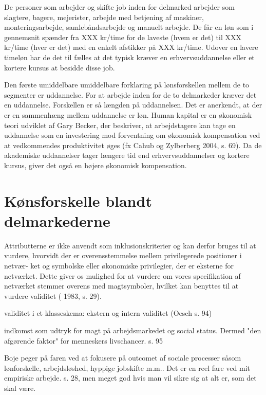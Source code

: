 %
De personer som arbejder og skifte job inden for delmarked  arbejder som slagtere, bagere, mejerister, arbejde med betjening af maskiner, monteringsarbejde, samlebåndsarbejde og manuelt arbejde. De får en løn som i gennemsnit spænder fra XXX kr/time for de laveste (hvem er det) til XXX kr/time (hver er det) med en enkelt afstikker på XXX kr/time. Udover en lavere timeløn har de det til fælles at det typisk kræver en erhvervsuddannelse eller et kortere kursus at besidde disse job.

Den første umiddelbare umiddelbare forklaring på lønsforskellen mellem de to segmenter er uddannelse. For at arbejde inden for de to delmarkeder kræver det en uddannelse. Forskellen er så længden på uddannelsen. Det er anerkendt, at der er en sammenhæng mellem uddannelse er løn. Human kapital er en økonomisk teori udviklet af Gary Becker, der beskriver, at arbejdstagere kan tage en uddannelse som en investering mod forventning om økonomisk kompensation ved at vedkommendes produktivitet øges (fx Cahub og Zylberberg 2004, s. 69). Da de akademiske uddannelser tager længere tid end erhvervsuddannelser og kortere kursus, giver det også en højere økonomisk kompensation. 


\newpage \section{Kønsforskelle blandt delmarkederne \label{sec_delanalyse2_loen}}


\iffalse
\label{iffalse}

Attributterne er ikke anvendt som inklusionskriterier og kan derfor bruges til at
vurdere, hvorvidt der er overensstemmelse mellem privilegerede positioner i netvær-
ket og symbolske eller økonomiske privilegier, der er eksterne for netværket. Dette giver
os mulighed for at vurdere om vores specifikation af netværket stemmer overens med
magtsymboler, hvilket kan benyttes til at vurdere validitet ( 1983, s. 29).


validitet i et klasseskema: ekstern og intern validitet (Oesch s. 94)

indkomst som udtryk for magt på arbejdsmarkedet og social status. Dermed "den afgørende faktor" for menneskers livschancer. s. 95

Boje peger på faren ved at fokusere på outcomet af sociale processer såsom lønforskelle, arbejdsløshed, hyppige jobskifte m.m.. Det er en reel fare ved mit empiriske arbejde. s. 28, men meget god hvis man vil sikre sig at alt er, som det skal være. 

